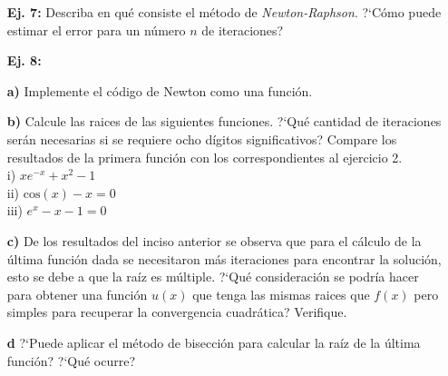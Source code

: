 \documentclass[11pt]{article}
\begin{document}
\begin{itemize}
\item[{\bf Ej. 7:}] Describa en qu\'e consiste el m\'etodo de \textit{Newton-Raphson}. ?`C\'omo puede estimar el error para un n\'umero $n$ de iteraciones?

\item[{\bf Ej. 8:}] 
\item [{\bf a)}] Implemente el c\'odigo de Newton como una funci\'on.
\item [{\bf b)}] Calcule las raices de las siguientes funciones. ?`Qu\'e cantidad de iteraciones ser\'an necesarias si se requiere ocho d\'igitos significativos? Compare los resultados de la primera funci\'on con los correspondientes al ejercicio 2.\\

	i) $xe^{-x} + x^{2} -1$\\
	ii) $\mathrm{cos}(x) -x = 0$   \\
    iii) $e^{x} -x -1 = 0$

\item[{\bf c)}] De los resultados del inciso anterior se observa que para el c\'alculo de la \'ultima funci\'on dada se necesitaron m\'as iteraciones para encontrar la soluci\'on, esto se debe a que la ra\'iz es m\'ultiple. ?`Qu\'e consideraci\'on se podr\'ia hacer para obtener una funci\'on $u(x)$ que tenga las mismas raices que $f(x)$ pero simples para recuperar la convergencia cuadr\'atica? Verifique.  
\item[{\bf d}] ?`Puede aplicar el m\'etodo de bisecci\'on para calcular la ra\'iz de la \'ultima funci\'on? ?`Qu\'e ocurre?

      


\end{itemize}
\end{document}
